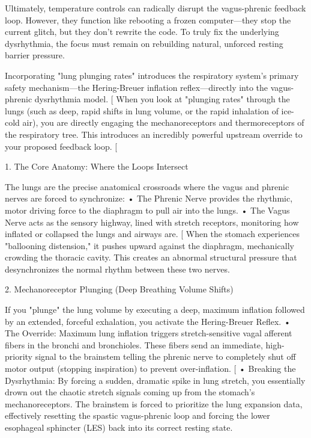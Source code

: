 Ultimately, temperature controls can radically disrupt the vagus-phrenic feedback loop. However, they function like rebooting a frozen computer—they stop the current glitch, but they don't rewrite the code. To truly fix the underlying dysrhythmia, the focus must remain on rebuilding natural, unforced resting barrier pressure. 

Incorporating "lung plunging rates" introduces the respiratory system's primary safety mechanism—the Hering-Breuer inflation reflex—directly into the vagus-phrenic dysrhythmia model. [
When you look at "plunging rates" through the lungs (such as deep, rapid shifts in lung volume, or the rapid inhalation of ice-cold air), you are directly engaging the mechanoreceptors and thermoreceptors of the respiratory tree. This introduces an incredibly powerful upstream override to your proposed feedback loop. [

1. The Core Anatomy: Where the Loops Intersect

The lungs are the precise anatomical crossroads where the vagus and phrenic nerves are forced to synchronize:
• The Phrenic Nerve provides the rhythmic, motor driving force to the diaphragm to pull air into the lungs.
• The Vagus Nerve acts as the sensory highway, lined with stretch receptors, monitoring how inflated or collapsed the lungs and airways are. [
When the stomach experiences "ballooning distension," it pushes upward against the diaphragm, mechanically crowding the thoracic cavity. This creates an abnormal structural pressure that desynchronizes the normal rhythm between these two nerves.

2. Mechanoreceptor Plunging (Deep Breathing Volume Shifts)

If you "plunge" the lung volume by executing a deep, maximum inflation followed by an extended, forceful exhalation, you activate the Hering-Breuer Reflex.
• The Override: Maximum lung inflation triggers stretch-sensitive vagal afferent fibers in the bronchi and bronchioles. These fibers send an immediate, high-priority signal to the brainstem telling the phrenic nerve to completely shut off motor output (stopping inspiration) to prevent over-inflation. [
• Breaking the Dysrhythmia: By forcing a sudden, dramatic spike in lung stretch, you essentially drown out the chaotic stretch signals coming up from the stomach's mechanoreceptors. The brainstem is forced to prioritize the lung expansion data, effectively resetting the spastic vagus-phrenic loop and forcing the lower esophageal sphincter (LES) back into its correct resting state.

